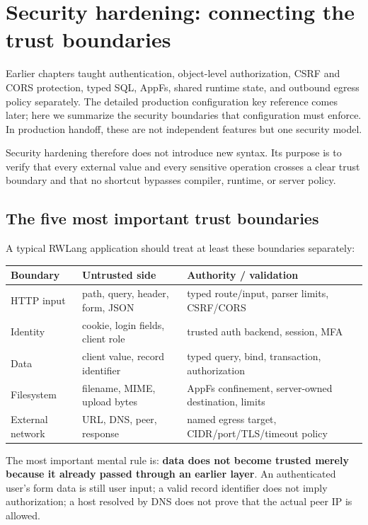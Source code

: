 \chapter{Security hardening: connecting the trust boundaries}

Earlier chapters taught authentication, object-level authorization, CSRF and CORS protection, typed SQL, AppFs, shared runtime state, and outbound egress policy separately. The detailed production configuration key reference comes later; here we summarize the security boundaries that configuration must enforce. In production handoff, these are not independent features but one security model.

Security hardening therefore does not introduce new syntax. Its purpose is to verify that every external value and every sensitive operation crosses a clear trust boundary and that no shortcut bypasses compiler, runtime, or server policy.

\section{The five most important trust boundaries}

A typical RWLang application should treat at least these boundaries separately:

\begin{longtable}{L{0.25\textwidth}L{0.31\textwidth}L{0.34\textwidth}}
\toprule
Boundary & Untrusted side & Authority / validation \\
\midrule
HTTP input & path, query, header, form, JSON & typed route/input, parser limits, CSRF/CORS \\
Identity & cookie, login fields, client role & trusted auth backend, session, MFA \\
Data & client value, record identifier & typed query, bind, transaction, authorization \\
Filesystem & filename, MIME, upload bytes & AppFs confinement, server-owned destination, limits \\
External network & URL, DNS, peer, response & named egress target, CIDR/port/TLS/timeout policy \\
\bottomrule
\end{longtable}

The most important mental rule is: \textbf{data does not become trusted merely because it already passed through an earlier layer}. An authenticated user's form data is still user input; a valid record identifier does not imply authorization; a host resolved by DNS does not prove that the actual peer IP is allowed.


